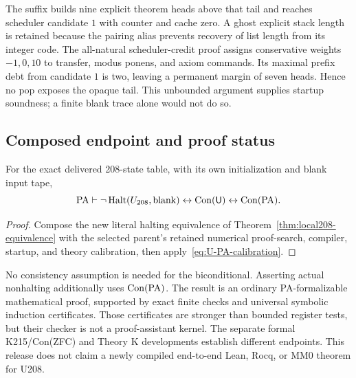 The suffix builds nine explicit theorem heads above that tail and reaches
scheduler candidate $1$ with counter and cache zero. A ghost explicit
stack length is retained because the pairing alias prevents recovery of
list length from its integer code. The all-natural scheduler-credit proof
assigns conservative weights $-1,0,10$ to transfer, modus ponens, and axiom
commands. Its maximal prefix debt from candidate $1$ is two, leaving a
permanent margin of seven heads. Hence no pop exposes the opaque tail.
This unbounded argument supplies startup soundness; a finite blank trace
alone would not do so.

\subsection{Composed endpoint and proof status}

\begin{corollary}
For the exact delivered 208-state table, with its own initialization and
blank input tape,
\[
 \mathrm{PA}\vdash
 \neg\operatorname{Halt}(U_{208},\mathrm{blank})
       \leftrightarrow\operatorname{Con}(\mathsf U)
       \leftrightarrow\operatorname{Con}(\mathrm{PA}).
\]
\end{corollary}
\begin{proof}
Compose the new literal halting equivalence of
Theorem~\ref{thm:local208-equivalence} with the selected parent's retained
numerical proof-search, compiler, startup, and theory calibration, then
apply~\eqref{eq:U-PA-calibration}.
\end{proof}

No consistency assumption is needed for the biconditional. Asserting
actual nonhalting additionally uses $\operatorname{Con}(\mathrm{PA})$. The result is an ordinary
PA-formalizable mathematical proof, supported by exact finite checks and
universal symbolic induction certificates. Those certificates are stronger
than bounded register tests, but their checker is not a proof-assistant
kernel. The separate formal K215/Con(ZFC) and Theory K developments
\cite{k215pa,k230} establish different endpoints. This release does not
claim a newly compiled end-to-end Lean, Rocq, or MM0 theorem for U208.
